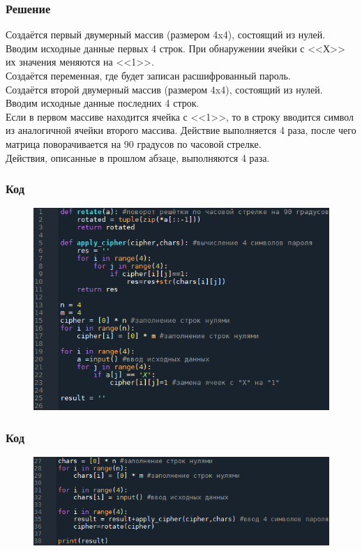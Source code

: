 \documentclass[t]{beamer}
\begin{document}
\begin{frame}
    \frametitle{Решение}
        \begin{block}{}
		     {Создаётся первый двумерный массив (размером 4x4), состоящий из нулей. Вводим исходные данные первых 4 строк. При обнаружении ячейки с <<Х>> их значения меняются на <<1>>. \\ Создаётся переменная, где будет записан расшифрованный пароль. \\ Создаётся второй двумерный массив (размером 4x4), состоящий из нулей. Вводим исходные данные последних 4 строк. \\ Если в первом массиве находится ячейка с <<1>>, то в строку вводится символ из аналогичной ячейки второго массива. Действие выполняется 4 раза, после чего матрица поворачивается на 90 градусов по часовой стрелке. \\ Действия, описанные в прошлом абзаце, выполняются 4 раза.}
	    \end{block}
\end{frame}

\begin{frame}
	\frametitle{Код}
		\begin{figure}
		     \centering
		     \includegraphics[width=0.9\linewidth]{Screenshot_109.png}
		     \label{fig:my_label}
		 \end{figure}
\end{frame}

\begin{frame}[c]
    \frametitle{Код}
		\begin{figure}
		     \centering
		     \includegraphics[width=1.0\linewidth]{Screenshot_110.png}
		     \label{fig:my_label}
		 \end{figure}
\end{frame}
\end{document}
